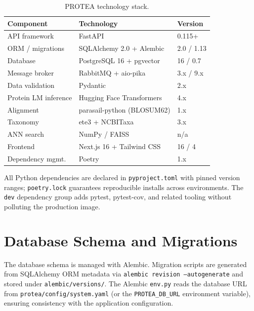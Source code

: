 \begin{table}[htbp]
  \centering
  \caption{PROTEA technology stack.}
  \label{tab:stack}
  \begin{tabular}{lll}
    \toprule
    \textbf{Component}   & \textbf{Technology}         & \textbf{Version} \\
    \midrule
    API framework        & FastAPI                     & 0.115+           \\
    ORM / migrations     & SQLAlchemy 2.0 + Alembic    & 2.0 / 1.13       \\
    Database             & PostgreSQL 16 + pgvector    & 16 / 0.7         \\
    Message broker       & RabbitMQ + aio-pika         & 3.x / 9.x        \\
    Data validation      & Pydantic                    & 2.x              \\
    Protein LM inference & Hugging Face Transformers   & 4.x              \\
    Alignment            & parasail-python (BLOSUM62)  & 1.x              \\
    Taxonomy             & ete3 + NCBITaxa             & 3.x              \\
    ANN search           & NumPy / FAISS               & n/a              \\
    Frontend             & Next.js 16 + Tailwind CSS   & 16 / 4           \\
    Dependency mgmt.     & Poetry                      & 1.x              \\
    \bottomrule
  \end{tabular}
\end{table}

All Python dependencies are declared in \texttt{pyproject.toml} with pinned
version ranges; \texttt{poetry.lock} guarantees reproducible installs across
environments. The \texttt{dev} dependency group adds pytest, pytest-cov, and
related tooling without polluting the production image.

\section{Database Schema and Migrations}
\label{sec:database}

The database schema is managed with Alembic. Migration scripts are generated
from SQLAlchemy ORM metadata via \texttt{alembic revision --autogenerate} and
stored under \texttt{alembic/versions/}. The Alembic \texttt{env.py} reads the
database URL from \texttt{protea/config/system.yaml} (or the \texttt{PROTEA\_DB\_URL}
environment variable), ensuring consistency with the application configuration.

